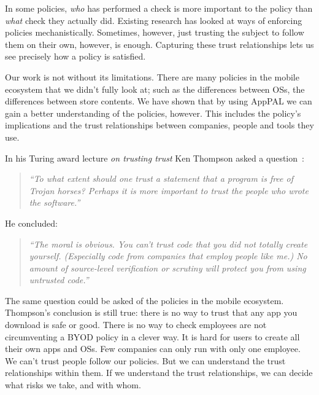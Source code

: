\documentclass[thesis.tex]{subfiles}
\begin{document}
In some policies, \emph{who} has performed a check is more important
to the policy than \emph{what} check they actually did. Existing
research has looked at ways of enforcing policies
mechanistically. Sometimes, however, just trusting the subject to
follow them on their own, however, is enough.  Capturing these trust
relationships lets us see precisely how a policy is satisfied.

Our work is not without its limitations. There are many policies in the mobile
ecosystem that we didn't fully look at; such as the differences between OSs, the
differences between store contents. We have shown that by using AppPAL we can
gain a better understanding of the policies, however. This includes the policy's
implications and the trust relationships between companies, people and tools
they use.

\hspace{1em}

\noindent In his Turing award lecture \emph{on trusting trust} Ken Thompson asked a
question~\cite{ken_thompson_reflections_1984}:
\begin{quotation}\itshape\noindent
  ``To what extent should one trust a statement that a program is free of Trojan
  horses? Perhaps it is more important to trust the people who wrote the
  software.''
\end{quotation}
He concluded:
\begin{quotation}\itshape\noindent
  ``The moral is obvious. You can't trust code that you did not totally create
  yourself. (Especially code from companies that employ people like me.)
  No amount of source-level verification or scrutiny will protect you from using untrusted code.''
\end{quotation} 
The same question could be asked of the policies in the mobile
ecosystem. Thompson's conclusion is still true: there is no way to trust that
any app you download is safe or good. There is no way to check employees
are not circumventing a BYOD policy in a clever way. It is hard
for users to create all their own apps and OSs. Few companies can only run
with only one employee. We can't trust people follow our policies. But we can
understand the trust relationships within them. If we understand the trust
relationships, we can decide what risks we take, and with whom.
\end{document}
